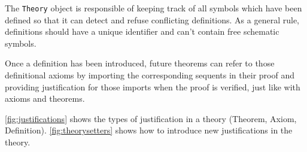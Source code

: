 The \lstinline{Theory}{} object is responsible of keeping track of all symbols which have been defined so that it can detect and refuse conflicting definitions. As a general rule, definitions should have a unique identifier and can't contain free schematic symbols.

Once a definition has been introduced, future theorems can refer to those definitional axioms by importing the corresponding sequents in their proof and providing justification for those imports when the proof is verified, just like with axioms and theorems.

\autoref{fig:justifications} shows the types of justification in a theory (Theorem, Axiom, Definition). \autoref{fig:theorysetters} shows how to introduce new justifications in the theory.



